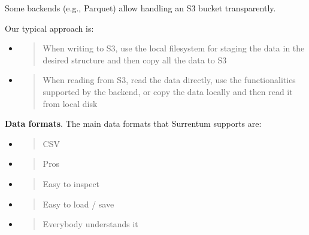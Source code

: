 \documentclass[11pt, reqno]{amsart}
\begin{document}
Some backends (e.g., Parquet) allow handling an S3 bucket transparently.

Our typical approach is:

\begin{itemize}
\item
  \begin{quote}
  When writing to S3, use the local filesystem for staging the data in
  the desired structure and then copy all the data to S3
  \end{quote}
\item
  \begin{quote}
  When reading from S3, read the data directly, use the functionalities
  supported by the backend, or copy the data locally and then read it
  from local disk
  \end{quote}
\end{itemize}

\textbf{Data formats}. The main data formats that Surrentum supports
are:

\begin{itemize}
\item
  \begin{quote}
  CSV
  \end{quote}
\end{itemize}

\begin{itemize}
\item
  \begin{quote}
  Pros
  \end{quote}
\end{itemize}

\begin{itemize}
\item
  \begin{quote}
  Easy to inspect
  \end{quote}
\end{itemize}

\begin{itemize}
\item
  \begin{quote}
  Easy to load / save
  \end{quote}
\item
  \begin{quote}
  Everybody understands it
  \end{quote}
\end{itemize}
\end{document}
